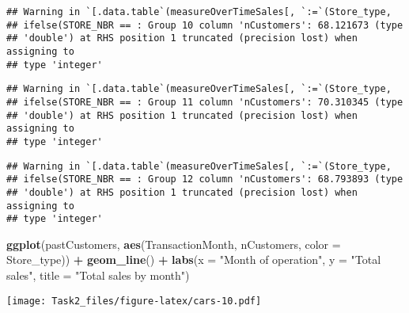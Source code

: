 \documentclass[
]{article}
\newenvironment{Shaded}{\begin{snugshade}}{\end{snugshade}}
\newcommand{\DataTypeTok}[1]{\textcolor[rgb]{0.13,0.29,0.53}{#1}}
\newcommand{\KeywordTok}[1]{\textcolor[rgb]{0.13,0.29,0.53}{\textbf{#1}}}
\newcommand{\NormalTok}[1]{#1}
\newcommand{\OperatorTok}[1]{\textcolor[rgb]{0.81,0.36,0.00}{\textbf{#1}}}
\newcommand{\StringTok}[1]{\textcolor[rgb]{0.31,0.60,0.02}{#1}}
\begin{document}
\begin{verbatim}
## Warning in `[.data.table`(measureOverTimeSales[, `:=`(Store_type,
## ifelse(STORE_NBR == : Group 10 column 'nCustomers': 68.121673 (type
## 'double') at RHS position 1 truncated (precision lost) when assigning to
## type 'integer'
\end{verbatim}

\begin{verbatim}
## Warning in `[.data.table`(measureOverTimeSales[, `:=`(Store_type,
## ifelse(STORE_NBR == : Group 11 column 'nCustomers': 70.310345 (type
## 'double') at RHS position 1 truncated (precision lost) when assigning to
## type 'integer'
\end{verbatim}

\begin{verbatim}
## Warning in `[.data.table`(measureOverTimeSales[, `:=`(Store_type,
## ifelse(STORE_NBR == : Group 12 column 'nCustomers': 68.793893 (type
## 'double') at RHS position 1 truncated (precision lost) when assigning to
## type 'integer'
\end{verbatim}

\begin{Shaded}
\begin{Highlighting}[]
\KeywordTok{ggplot}\NormalTok{(pastCustomers, }\KeywordTok{aes}\NormalTok{(TransactionMonth, nCustomers, }\DataTypeTok{color =}\NormalTok{ Store_type)) }\OperatorTok{+}
\StringTok{  }\KeywordTok{geom_line}\NormalTok{() }\OperatorTok{+}
\StringTok{  }\KeywordTok{labs}\NormalTok{(}\DataTypeTok{x =} \StringTok{"Month of operation"}\NormalTok{, }\DataTypeTok{y =} \StringTok{"Total sales"}\NormalTok{, }\DataTypeTok{title =} \StringTok{"Total sales by month"}\NormalTok{)}
\end{Highlighting}
\end{Shaded}

\texttt{[image: Task2\_files/figure-latex/cars-10.pdf]}
\end{document}

